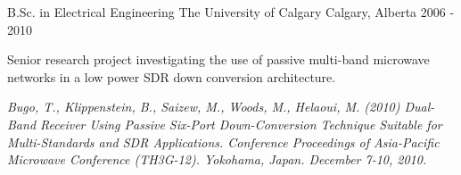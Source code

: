 


\begin{cventries}


    \cventry
    {B.Sc. in Electrical Engineering} %
    {The University of Calgary} %
    {Calgary, Alberta} %
    {2006 - 2010} %
    { %
        \begin{cvitems}
            \item {Senior research project investigating the use of passive multi-band microwave networks in a low power SDR down conversion architecture.}
            \item {}\emph{ Bugo, T., Klippenstein, B., Saizew, M., Woods, M., Helaoui, M. (2010) Dual-Band Receiver Using Passive Six-Port Down-Conversion Technique Suitable for Multi-Standards and SDR Applications. Conference Proceedings of Asia-Pacific Microwave Conference (TH3G-12). Yokohama, Japan. December 7-10, 2010.}
        \end{cvitems}
    }


\end{cventries}